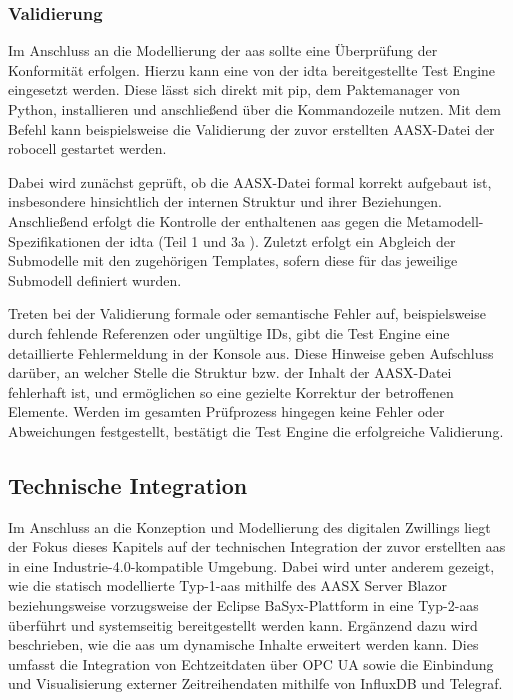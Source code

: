 \subsubsection{Validierung}
Im Anschluss an die Modellierung der \acs{aas} sollte eine Überprüfung der Konformität erfolgen.
Hierzu kann eine von der \acs{idta} bereitgestellte Test Engine \cite{TestEngine} eingesetzt werden. 
Diese lässt sich direkt mit pip, dem Paktemanager von Python, installieren und anschließend über die Kommandozeile nutzen.
Mit dem Befehl  kann beispielsweise die Validierung der zuvor erstellten AASX-Datei der robocell gestartet werden.

Dabei wird zunächst geprüft, ob die AASX-Datei formal korrekt aufgebaut ist, insbesondere hinsichtlich der internen Struktur und ihrer Beziehungen.
Anschließend erfolgt die Kontrolle der enthaltenen \acs{aas} gegen die Metamodell-Spezifikationen der \acs{idta} (Teil 1 \cite{SpezifikationPart1} und 3a \cite{SpezifikationPart3a}).
Zuletzt erfolgt ein Abgleich der Submodelle mit den zugehörigen Templates, sofern diese für das jeweilige Submodell definiert wurden.

Treten bei der Validierung formale oder semantische Fehler auf, beispielsweise durch fehlende Referenzen oder ungültige IDs, gibt die Test Engine eine detaillierte Fehlermeldung in der Konsole aus. 
Diese Hinweise geben Aufschluss darüber, an welcher Stelle die Struktur bzw. der Inhalt der AASX-Datei fehlerhaft ist, und ermöglichen so eine gezielte Korrektur der betroffenen Elemente. 
Werden im gesamten Prüfprozess hingegen keine Fehler oder Abweichungen festgestellt, bestätigt die Test Engine die erfolgreiche Validierung.

\newpage
\subsection{Technische Integration}
Im Anschluss an die Konzeption und Modellierung des digitalen Zwillings liegt der Fokus dieses Kapitels auf der technischen Integration der zuvor erstellten \acs{aas} in eine Industrie-4.0-kompatible Umgebung.
Dabei wird unter anderem gezeigt, wie die statisch modellierte Typ-1-\acs{aas} mithilfe des AASX Server Blazor beziehungsweise vorzugsweise der Eclipse BaSyx-Plattform in eine Typ-2-\acs{aas} überführt und systemseitig bereitgestellt werden kann.
Ergänzend dazu wird beschrieben, wie die \acs{aas} um dynamische Inhalte erweitert werden kann.
Dies umfasst die Integration von Echtzeitdaten über OPC UA sowie die Einbindung und Visualisierung externer Zeitreihendaten mithilfe von InfluxDB und Telegraf.

